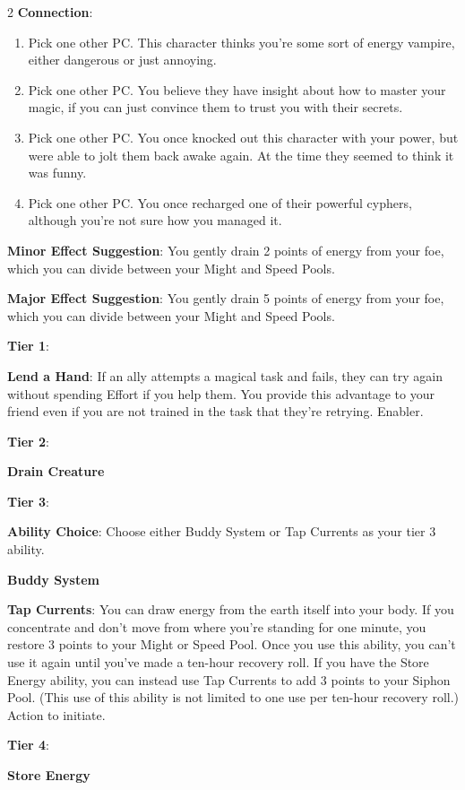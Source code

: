 \begin{multicols}{2}
\textbf{Connection}: 
\begin{enumerate}
\item Pick one other PC. This character thinks you’re some sort of energy vampire, either dangerous or just annoying.
\item Pick one other PC. You believe they have insight about how to master your magic, if you can just convince them to trust you with their secrets.
\item Pick one other PC. You once knocked out this character with your power, but were able to jolt them back awake again. At the time they seemed to think it was funny.
\item Pick one other PC. You once recharged one of their powerful cyphers, although you’re not sure how you managed it.
\end{enumerate}

\textbf{Minor Effect Suggestion}: You gently drain 2 points of energy from your foe, which you can divide between your Might and Speed Pools.

\textbf{Major Effect Suggestion}: You gently drain 5 points of energy from your foe, which you can divide between your Might and Speed Pools.

\textbf{Tier 1}:

\textbf{Lend a Hand}: If an ally attempts a magical task and fails, they can try again without spending Effort if you help them. You provide this advantage to your friend even if you are not trained in the task that they’re retrying. Enabler.

\textbf{Tier 2}:

\textbf{Drain Creature} 

\textbf{Tier 3}:

\textbf{Ability Choice}: Choose either Buddy System or Tap Currents as your tier 3 ability.

\textbf{Buddy System} 

\textbf{Tap Currents}: You can draw energy from the earth itself into your body. If you concentrate and don’t move from where you’re standing for one minute, you restore 3 points to your Might or Speed Pool. Once you use this ability, you can’t use it again until you’ve made a ten-hour recovery roll. If you have the Store Energy ability, you can instead use Tap Currents to add 3 points to your Siphon Pool. (This use of this ability is not limited to one use per ten-hour recovery roll.) Action to initiate.

\textbf{Tier 4}:

\textbf{Store Energy}


\end{multicols}
